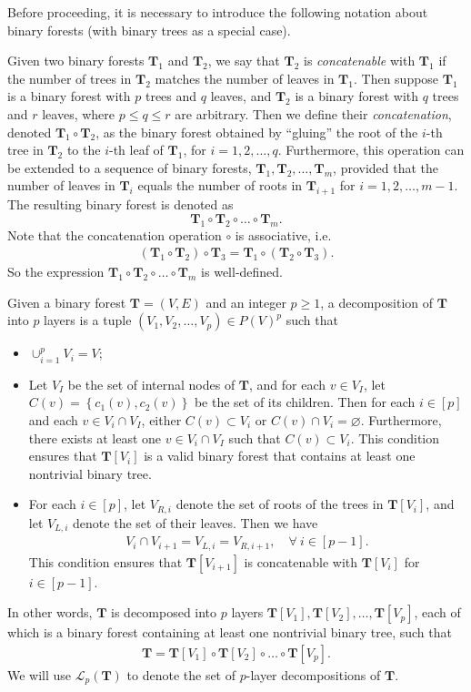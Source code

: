 \documentclass[superscriptaddress,onecolumn,nofootinbib,longbibliography,a4paper,accepted=2026-09-29]{quantumarticle}
\theoremstyle{plain}
\theoremstyle{definition}
\numberwithin{thm}{section}
\numberwithin{assumption}{section}
\numberwithin{lemma}{section}
\numberwithin{prop}{section}
\numberwithin{cor}{section}
\numberwithin{definition}{section}
\numberwithin{rmk}{section}
\numberwithin{equation}{section}
\newcommand{\lrcb}[1]{\left \{ #1 \right \}}
\renewcommand{\emptyset}{\varnothing}
\newcommand{\mbf}{\mathbf{T}}
\begin{document}
Before proceeding, it is necessary to introduce the following notation about binary forests (with binary trees as a special case). 

Given two binary forests $\mbf_1$ and $\mbf_2$, we say that $\mbf_2$ is \emph{concatenable} with $\mbf_1$ if the number of trees in $\mbf_2$ matches the number of leaves in $\mbf_1$. Then suppose $\mbf_1$ is a binary forest with $p$ trees and $q$ leaves, and $\mbf_2$ is a binary forest with $q$ trees and $r$ leaves, where $p \le q \le r$ are arbitrary. Then we define their \emph{concatenation}, denoted $\mbf_1 \circ \mbf_2$, as the binary forest obtained by ``gluing'' the root of the $i$-th tree in $\mbf_2$ to the $i$-th leaf of $\mbf_1$, for $i=1,2,\dots,q$. Furthermore, this operation can be extended to a sequence of binary forests, $\mbf_1, \mbf_2, \dots, \mbf_m$, provided that the number of leaves in $\mbf_i$ equals the number of roots in $\mbf_{i+1}$ for $i=1,2,\dots,m-1$. The resulting binary forest is denoted as $$\mbf_1 \circ \mbf_2 \circ \dots \circ \mbf_m.$$ Note that the concatenation operation $\circ$ is associative, i.e. 
\begin{align}
(\mbf_1 \circ \mbf_2) \circ \mbf_3 = \mbf_1 \circ (\mbf_2 \circ \mbf_3).    
\end{align}
So the expression $\mbf_1 \circ \mbf_2 \circ \dots \circ \mbf_m$ is well-defined.

Given a binary forest $\mbf=(V, E)$ and an integer $p \ge 1$, a decomposition of $\mbf$ into $p$ layers is a tuple $(V_1, V_2, \dots, V_p) \in P(V)^p$ such that
\begin{itemize}
    \item $\cup_{i=1}^p V_i = V$;
    \item Let $V_I$ be the set of internal nodes of $\mbf$, and for each $v \in V_I$, let $C(v)=\lrcb{c_1(v), c_2(v)}$ be the set of its children. Then for each $i \in [p]$ and each $v \in V_i \cap V_I$, either $C(v)\subset V_i$ or
    $C(v) \cap V_i = \emptyset$. Furthermore, there exists at least one $v \in V_i \cap V_I$ such that $C(v) \subset V_i$. This condition ensures that $\mbf[V_i]$ is a valid binary forest that contains at least one nontrivial binary tree.
    \item For each $i \in [p]$, let $V_{R, i}$ denote the set of roots of the trees in $\mbf[V_i]$, and let $V_{L, i}$ denote the set of their leaves. 
    Then we have
    \begin{align}
        V_i \cap V_{i+1}=V_{L,i}=V_{R, i+1},\quad\forall~i \in [p-1].        
    \end{align}
    This condition ensures that $\mbf[V_{i+1}]$ is concatenable with $\mbf[V_i]$ for $i \in [p-1]$.

\end{itemize}
In other words, $\mbf$ is decomposed into $p$ layers
$\mbf[V_1], \mbf[V_2], \dots, \mbf[V_p]$, each of which is a binary forest containing at least one nontrivial binary tree, such that
\begin{align}
    \mbf = \mbf[V_1] \circ \mbf[V_2] \circ \dots \circ \mbf[V_p].
\end{align}
We will use $\mathcal{L}_p(\mbf)$ to denote the set of $p$-layer decompositions of $\mbf$.
\end{document}
